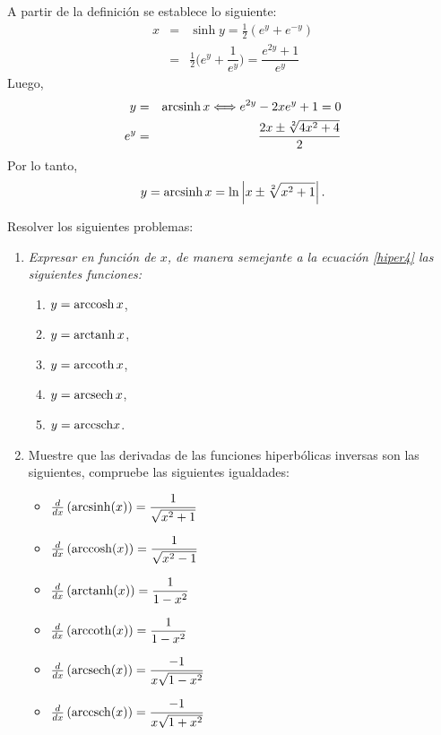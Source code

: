 \begin{tcolorbox}
  A partir de la definición se establece lo siguiente:
  \begin{eqnarray*}
    x &=& \sinh y=\frac{1}{2}(e^{y}+e^{-y}) \\
    &=& \frac{1}{2}\bigg (e^{y}+\dfrac{1}{e^{y}}\bigg ) =  \dfrac{e^{2y}+1}{e^{y}}
  \end{eqnarray*}
  Luego,
  \begin{eqnarray*} y &=& \operatorname{arcsinh} x \Longleftrightarrow e^{2y}-2x e^{y}+1=0 \\ e^{y} &=& \frac{2x\pm\sqrt[2]{4x^{2}+4}}{2}
  \end{eqnarray*}
  Por lo tanto,
  \begin{equation}\label{hiper4}
    y=\operatorname{arcsinh} x= \ln \left| x\pm \sqrt[2]{x^{2}+1}\right|.
  \end{equation}
\end{tcolorbox}

\begin{ejer} Resolver los siguientes problemas:
  \begin{enumerate}
    \item \textit{Expresar en función de $x$, de manera semejante a la ecuación \ref{hiper4}
      las siguientes funciones:}
      \begin{enumerate}
        \item $y=\operatorname{arccosh} x$,
        \item $y=\operatorname{arctanh} x$,
        \item $y=\operatorname{arccoth} x$,
        \item $y=\operatorname{arcsech} x$,
        \item $y={\rm arccsch} x$.
      \end{enumerate}

    \item Muestre que las derivadas de las funciones hiperbólicas inversas son las siguientes, compruebe las siguientes igualdades:
      \begin{itemize}
        \item $\frac{d}{dx}\left({\rm arcsinh}(x) \right) = \dfrac{1}{\sqrt{x^{2}+1}}$
        \item $\frac{d}{dx}\left({\rm arccosh}(x)\right) =\dfrac{1}{\sqrt{x^{2}-1}}$
        \item $\frac{d}{dx}\left({\rm arctanh}(x)\right) =\dfrac{1}{1-x^{2}}$
        \item $\frac{d}{dx}\left({\rm arccoth}(x)\right) =\dfrac{1}{1-x^{2}}$
        \item $\frac{d}{dx}\left({\rm arcsech}(x)\right) =\dfrac{-1}{x\sqrt{1-x^{2}}}$
        \item $\frac{d}{dx}\left({\rm arccsch}(x)\right) =\dfrac{-1}{x\sqrt{1+x^{2}}}$
      \end{itemize}
  \end{enumerate}
\end{ejer}


